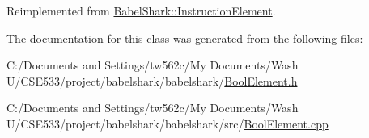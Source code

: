 Reimplemented from \hyperlink{class_babel_shark_1_1_instruction_element_7795ad0b2acedb5a2b68d2c3e63351ae}{BabelShark::InstructionElement}.

The documentation for this class was generated from the following files:\begin{CompactItemize}
\item 
C:/Documents and Settings/tw562c/My Documents/Wash U/CSE533/project/babelshark/babelshark/\hyperlink{_bool_element_8h}{BoolElement.h}\item 
C:/Documents and Settings/tw562c/My Documents/Wash U/CSE533/project/babelshark/babelshark/src/\hyperlink{_bool_element_8cpp}{BoolElement.cpp}\end{CompactItemize}

